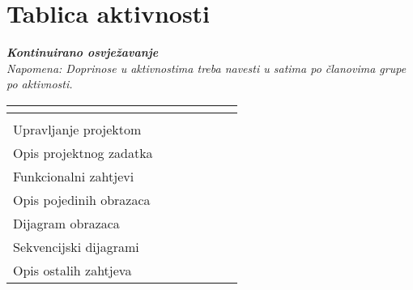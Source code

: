 		\eject
		\section*{Tablica aktivnosti}
		
			\textbf{\textit{Kontinuirano osvježavanje}}\\
			
			 \textit{Napomena: Doprinose u aktivnostima treba navesti u satima po članovima grupe po aktivnosti.}
					
						
			
			\begin{longtabu} to \textwidth {|X[7, l]|X[1, c]|X[1, c]|X[1, c]|X[1, c]|X[1, c]|X[1, c]|}
								
				  &      &  &	 &	 &
				 &
				 \\ \hline 
				\endfirsthead
				
			
				  &      &  &	 &	 &
				 &
				 \\ \hline  
				\endhead
				
				
				\endfoot
							
				 
				\endlastfoot
				
				Upravljanje projektom 		&  &  &  &  &  &   \\ \hline
				Opis projektnog zadatka 	&  &  &  &  &  &   \\ \hline
				
				Funkcionalni zahtjevi       &  &  &  &  &  &    \\ \hline
				Opis pojedinih obrazaca 	&  &  &  &  &  &    \\ \hline
				Dijagram obrazaca 			&  &  &  &  &  &    \\ \hline
				Sekvencijski dijagrami 		&  &  &  &  &  &    \\ \hline
				Opis ostalih zahtjeva 		&  &  &  &  &  &    \\ \hline


\end{longtabu}
